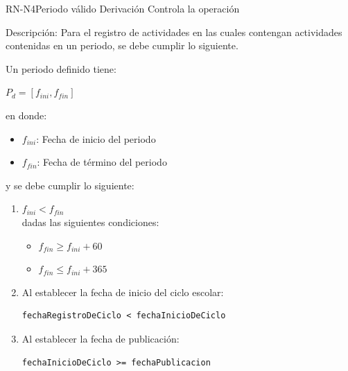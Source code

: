 \begin{BusinessRule}{RN-N4}{Periodo válido}
	{Derivación}
	{Controla la operación}
	\item[Descripción:] 
	Para el registro de actividades en las cuales contengan actividades contenidas en un periodo, se debe cumplir lo siguiente.
	
	Un periodo definido tiene:\\
	\begin{center}
        $P_d = [f_{ini},f_{fin}] $ \\	
	\end{center}

	en donde:\\
	\begin{itemize}
	    \item $f_{ini}$: Fecha de inicio del periodo
	    \item $f_{fin}$: Fecha de término del periodo
	\end{itemize}
	
	y se debe cumplir lo siguiente:

	\begin{enumerate}
	    \item $f_{ini} < f_{fin}$ \\
	
		dadas las siguientes condiciones:
		\begin{itemize}
		    \item $f_{fin} \geq f_{ini}+60$
		    \item $f_{fin} \leq f_{ini}+365$
        \end{itemize}		
		\item  Al establecer la fecha de inicio del ciclo escolar:
		\begin{verbatim}fechaRegistroDeCiclo < fechaInicioDeCiclo\end{verbatim}
		\item  Al establecer la fecha de publicación:
		\begin{verbatim}fechaInicioDeCiclo >= fechaPublicacion\end{verbatim}
		
	\end{enumerate}

\end{BusinessRule}

